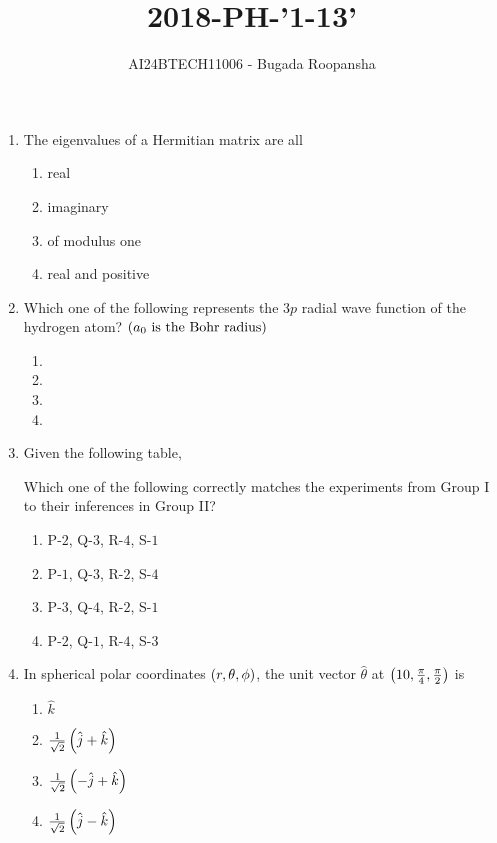 \documentclass[journal,12pt,twocolumn]{IEEEtran}
\theoremstyle{remark}
\begin{document}

\vspace{3cm}
\title{2018-PH-'1-13'}
\author{AI24BTECH11006 - Bugada Roopansha}
\maketitle

\begin{enumerate}[start=1]
 
   \item The eigenvalues of a Hermitian matrix are all
   \begin{enumerate}
       \item real
\item imaginary
\item of modulus one
\item  real and positive
   \end{enumerate}


\item Which one of the following represents the $3p$ radial wave function of the hydrogen atom? $\left(a_0 \text{ is the Bohr radius}\right)$

\begin{enumerate}

\item

\item

\item

\item

\end{enumerate}



\item Given the following table,


Which one of the following correctly matches the experiments from Group I to their inferences in Group II?
\begin{enumerate}
    \item P-$2$, Q-$3$, R-$4$, S-$1$
    \item P-$1$, Q-$3$, R-$2$, S-$4$
    \item P-$3$, Q-$4$, R-$2$, S-$1$
    \item P-$2$, Q-$1$, R-$4$, S-$3$
\end{enumerate}

\item In spherical polar coordinates $ \left(r, \theta, \phi\right) $, the unit vector $\hat{\theta}$ at $\left(10, \frac{\pi}{4}, \frac{\pi}{2}\right)$ is
\begin{enumerate}
    \item $\hat{k}$
    \item $\frac{1}{\sqrt{2}} \left(\hat{j} + \hat{k}\right)$
    \item $\frac{1}{\sqrt{2}} \left(-\hat{j} + \hat{k}\right)$
    \item $\frac{1}{\sqrt{2}} \left(\hat{j} - \hat{k}\right)$
\end{enumerate}


\end{enumerate}
\end{document}
